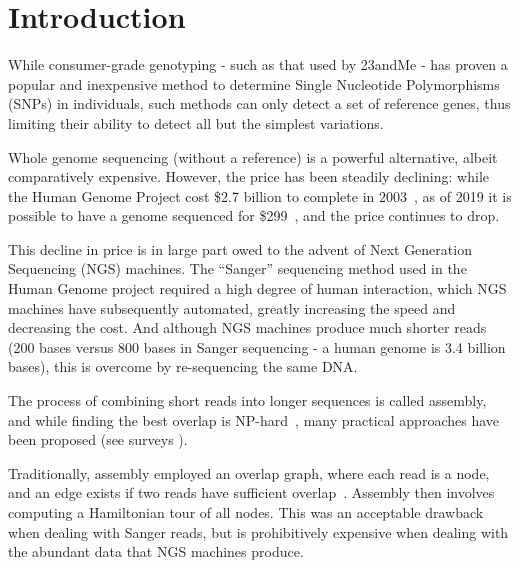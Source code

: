 \chapter{Introduction}
\label{chp:introduction}

While consumer-grade genotyping - such as that used by 23andMe - has proven a popular and inexpensive method to determine Single Nucleotide Polymorphisms (SNPs) in individuals, such methods can only detect a set of reference genes, thus limiting their ability to detect all but the simplest variations.

Whole genome sequencing (without a reference) is a powerful alternative, albeit comparatively expensive. However, the price has been steadily declining: while the Human Genome Project cost \$2.7 billion to complete in 2003~\cite{HGP}, as of 2019 it is possible to have a genome sequenced for \$299~\cite{dantelabscost}, and the price continues to drop.

This decline in price is in large part owed to the advent of Next Generation Sequencing (NGS) machines. The “Sanger” sequencing method used in the Human Genome project required a high degree of human interaction, which NGS machines have subsequently automated, greatly increasing the speed and decreasing the cost. And although NGS machines produce much shorter reads (200 bases versus 800 bases in Sanger sequencing - a human genome is 3.4 billion bases), this is overcome by re-sequencing the same DNA.


The process of combining short reads into longer sequences is called assembly, and while finding the best overlap is NP-hard~\cite{Mye95}, many practical approaches have been proposed (see surveys \cite{KasMor06, MilKor10, Pop09}).

Traditionally, assembly employed an overlap graph, where each read is a node, and an edge exists if two reads have sufficient overlap~\cite{BatJaf02,HuaYan05,MyeSut00}. Assembly then involves computing a Hamiltonian tour of all nodes. This was an acceptable drawback when dealing with Sanger reads, but is prohibitively expensive when dealing with the abundant data that NGS machines produce.

